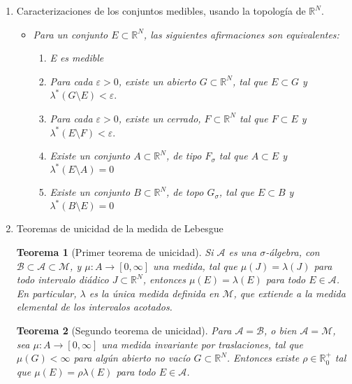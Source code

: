 \documentclass[a4paper, 12pt]{article}
\newtheorem*{teorema*}{Teorema}
\begin{document}
\begin{enumerate}[label=\textbf{\arabic*}.]
\begin{enumerate}[label=\textit{\alph*})]
	\item Caracterizaciones de los conjuntos medibles, usando la topología de \(\mathbb{R}^N\).
	\begin{itemize}
		\item \textit{Para un conjunto \(E \subset \mathbb{R}^N\), las siguientes afirmaciones son equivalentes:}
		\begin{enumerate}[label=(\textit{\roman*})]
			\item \textit{E es medible}
			\item \textit{Para cada \(\varepsilon > 0\), existe un abierto \(G \subset \mathbb{R}^N\), tal que \(E \subset G\) y \(\lambda^*(G \setminus E) < \varepsilon\)}.
			\item \textit{Para cada \(\varepsilon > 0\), existe un cerrado, \(F \subset \mathbb{R}^N\) tal que \(F \subset E\) y \(\lambda^*(E \setminus F) < \varepsilon\)}.
			\item \textit{Existe un conjunto \(A \subset \mathbb{R}^N\), de tipo \(F_{\sigma}\) tal que \(A \subset E\) y \(\lambda^*(E \setminus A) = 0\)}
			\item \textit{Existe un conjunto \(B \subset \mathbb{R}^N\), de topo \(G_{\sigma}\), tal que \(E \subset B\) y \(\lambda^*(B \setminus E) = 0\)}
		\end{enumerate}
	\end{itemize}
	
	\item Teoremas de unicidad de la medida de Lebesgue
	
	\begin{teorema*}[Primer teorema de unicidad]
	Si \(\mathcal{A}\) es una \(\sigma\)-álgebra, con \(\mathcal{B} \subset \mathcal{A} \subset \mathcal{M}\), y \(\mu : A \to [0, \infty]\) una medida, tal que \(\mu (J) = \lambda (J)\) para todo intervalo diádico \(J \subset \mathbb{R}^N\), entonces \(\mu (E) = \lambda (E)\) para todo \(E \in \mathcal{A}\). En particular, \(\lambda\) es la única medida definida en \(\mathcal{M}\), que extiende a la medida elemental de los intervalos acotados.
	\end{teorema*}
	
	\medskip
	
	\begin{teorema*}[Segundo teorema de unicidad]
	Para \(\mathcal{A} = \mathcal{B}\), o bien \(\mathcal{A} = \mathcal{M}\), sea \(\mu : A \to [0, \infty]\) una medida invariante por traslaciones, tal que \(\mu (G) < \infty\) para algún abierto no vacío \(G \subset \mathbb{R}^N\). Entonces existe \(\rho \in \mathbb{R}_0^+\) tal que \(\mu (E) = \rho \lambda (E)\) para todo \(E \in \mathcal{A}\).
	\end{teorema*}


\end{enumerate}
\end{enumerate}
\end{document}
